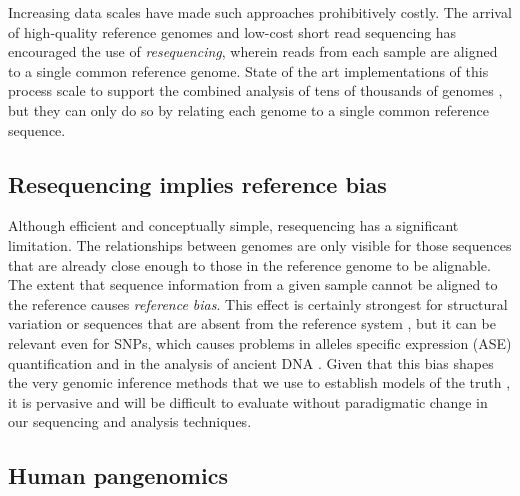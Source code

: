 Increasing data scales have made such approaches prohibitively costly.
The arrival of high-quality reference genomes and low-cost short read sequencing has encouraged the use of \emph{resequencing}, wherein reads from each sample are aligned to a single common reference genome.
State of the art implementations of this process scale to support the combined analysis of tens of thousands of genomes \cite{Poplin_2017}, but they can only do so by relating each genome to a single common reference sequence.

\subsection{Resequencing implies reference bias}

Although efficient and conceptually simple, resequencing has a significant limitation.
The relationships between genomes are only visible for those sequences that are already close enough to those in the reference genome to be alignable.
The extent that sequence information from a given sample cannot be aligned to the reference causes \emph{reference bias}.
This effect is certainly strongest for structural variation or sequences that are absent from the reference system \cite{sudmant2015integrated}, but it can be relevant even for SNPs, which causes problems in alleles specific expression (ASE) quantification \cite{stevenson2013sources,Castel2015-ef} and in the analysis of ancient DNA \cite{zhou2017antcaller}.
Given that this bias shapes the very genomic inference methods that we use to establish models of the truth \cite{zook2014integrating}, it is pervasive and will be difficult to evaluate without paradigmatic change in our sequencing and analysis techniques.

\subsection{Human pangenomics}

